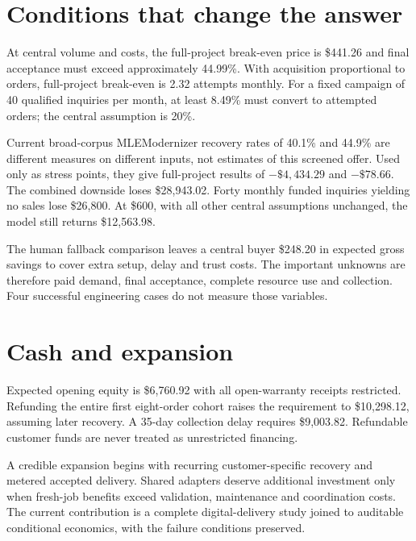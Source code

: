 \documentclass[10pt,letterpaper]{article}
\begin{document}
\section{Conditions that change the answer}
At central volume and costs, the full-project break-even price is \$441.26 and final acceptance must exceed approximately 44.99\%. With acquisition proportional to orders, full-project break-even is 2.32 attempts monthly. For a fixed campaign of 40 qualified inquiries per month, at least 8.49\% must convert to attempted orders; the central assumption is 20\%.

Current broad-corpus MLEModernizer recovery rates of 40.1\% and 44.9\% are different measures on different inputs, not estimates of this screened offer. Used only as stress points, they give full-project results of $-\$4,434.29$ and $-\$78.66$. The combined downside loses \$28,943.02. Forty monthly funded inquiries yielding no sales lose \$26,800. At \$600, with all other central assumptions unchanged, the model still returns \$12,563.98.

The human fallback comparison leaves a central buyer \$248.20 in expected gross savings to cover extra setup, delay and trust costs. The important unknowns are therefore paid demand, final acceptance, complete resource use and collection. Four successful engineering cases do not measure those variables.

\section{Cash and expansion}
Expected opening equity is \$6,760.92 with all open-warranty receipts restricted. Refunding the entire first eight-order cohort raises the requirement to \$10,298.12, assuming later recovery. A 35-day collection delay requires \$9,003.82. Refundable customer funds are never treated as unrestricted financing.

A credible expansion begins with recurring customer-specific recovery and metered accepted delivery. Shared adapters deserve additional investment only when fresh-job benefits exceed validation, maintenance and coordination costs. The current contribution is a complete digital-delivery study joined to auditable conditional economics, with the failure conditions preserved.
\end{document}
